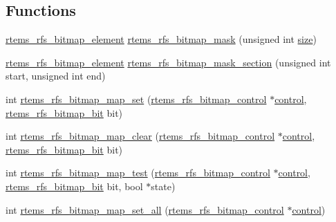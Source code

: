 \subsection*{Functions}
\begin{DoxyCompactItemize}
\item 
\mbox{\hyperlink{rtems-rfs-bitmaps_8h_a2e909e0a0c9759ac71ca69851253b905}{rtems\+\_\+rfs\+\_\+bitmap\+\_\+element}} \mbox{\hyperlink{rtems-rfs-bitmaps_8c_a6c6686287ba3caa0684a13233870c2ce}{rtems\+\_\+rfs\+\_\+bitmap\+\_\+mask}} (unsigned int \mbox{\hyperlink{sun4u_2tte_8h_a245260f6f74972558f61b85227df5aae}{size}})
\item 
\mbox{\hyperlink{rtems-rfs-bitmaps_8h_a2e909e0a0c9759ac71ca69851253b905}{rtems\+\_\+rfs\+\_\+bitmap\+\_\+element}} \mbox{\hyperlink{rtems-rfs-bitmaps_8c_ab7bd24e753558028374d00c06c99ded1}{rtems\+\_\+rfs\+\_\+bitmap\+\_\+mask\+\_\+section}} (unsigned int start, unsigned int end)
\item 
int \mbox{\hyperlink{rtems-rfs-bitmaps_8c_a36abb0e8f56bc9307bef555ec0f740be}{rtems\+\_\+rfs\+\_\+bitmap\+\_\+map\+\_\+set}} (\mbox{\hyperlink{rtems-rfs-bitmaps_8h_aa1b1de5abc294444428eb1038d7f898b}{rtems\+\_\+rfs\+\_\+bitmap\+\_\+control}} $\ast$\mbox{\hyperlink{structcontrol}{control}}, \mbox{\hyperlink{rtems-rfs-bitmaps_8h_acc1b0aefe1b090890ccbc1b05279a78e}{rtems\+\_\+rfs\+\_\+bitmap\+\_\+bit}} bit)
\item 
int \mbox{\hyperlink{rtems-rfs-bitmaps_8c_aa4bd94b56bf1969270c51b4534ad5677}{rtems\+\_\+rfs\+\_\+bitmap\+\_\+map\+\_\+clear}} (\mbox{\hyperlink{rtems-rfs-bitmaps_8h_aa1b1de5abc294444428eb1038d7f898b}{rtems\+\_\+rfs\+\_\+bitmap\+\_\+control}} $\ast$\mbox{\hyperlink{structcontrol}{control}}, \mbox{\hyperlink{rtems-rfs-bitmaps_8h_acc1b0aefe1b090890ccbc1b05279a78e}{rtems\+\_\+rfs\+\_\+bitmap\+\_\+bit}} bit)
\item 
int \mbox{\hyperlink{rtems-rfs-bitmaps_8c_abc6a4b7a3b0ef2602246517f9bb4e9a3}{rtems\+\_\+rfs\+\_\+bitmap\+\_\+map\+\_\+test}} (\mbox{\hyperlink{rtems-rfs-bitmaps_8h_aa1b1de5abc294444428eb1038d7f898b}{rtems\+\_\+rfs\+\_\+bitmap\+\_\+control}} $\ast$\mbox{\hyperlink{structcontrol}{control}}, \mbox{\hyperlink{rtems-rfs-bitmaps_8h_acc1b0aefe1b090890ccbc1b05279a78e}{rtems\+\_\+rfs\+\_\+bitmap\+\_\+bit}} bit, bool $\ast$state)
\item 
int \mbox{\hyperlink{rtems-rfs-bitmaps_8c_a88705115aae0a4ba16c754dc2be2ae6b}{rtems\+\_\+rfs\+\_\+bitmap\+\_\+map\+\_\+set\+\_\+all}} (\mbox{\hyperlink{rtems-rfs-bitmaps_8h_aa1b1de5abc294444428eb1038d7f898b}{rtems\+\_\+rfs\+\_\+bitmap\+\_\+control}} $\ast$\mbox{\hyperlink{structcontrol}{control}})

\end{DoxyCompactItemize}
